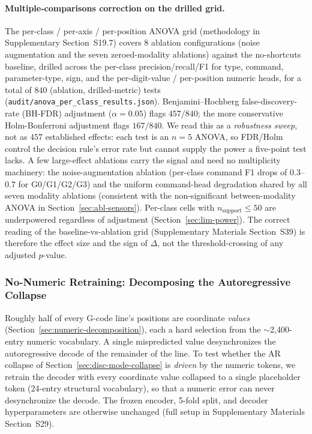\documentclass[sensors,article,submit,moreauthors,pdftex]{Definitions/mdpi}
\begin{document}
\paragraph{Multiple-comparisons correction on the drilled grid.} The per-class / per-axis / per-position ANOVA grid (methodology in Supplementary Section~S19.7) covers 8 ablation configurations (noise augmentation and the seven zeroed-modality ablations) against the no-shortcuts baseline, drilled across the per-class precision/recall/F1 for type, command, parameter-type, sign, and the per-digit-value / per-position numeric heads, for a total of $840$ (ablation, drilled-metric) tests (\texttt{audit/anova\_per\_class\_results.json}). Benjamini--Hochberg false-discovery-rate (BH-FDR) adjustment ($\alpha=0.05$) flags $457 / 840$; the more conservative Holm-Bonferroni adjustment flags $167 / 840$. We read this as a \emph{robustness sweep}, not as $457$ established effects: each test is an $n\!=\!5$ ANOVA, so FDR/Holm control the decision rule's error rate but cannot supply the power a five-point test lacks. A few large-effect ablations carry the signal and need no multiplicity machinery: the noise-augmentation ablation (per-class command F1 drops of $0.3$--$0.7$ for G0/G1/G2/G3) and the uniform command-head degradation shared by all seven modality ablations (consistent with the non-significant between-modality ANOVA in Section~\ref{sec:abl-sensors}). Per-class cells with $n_{\text{support}}\le 50$ are underpowered regardless of adjustment (Section~\ref{sec:lim-power}). The correct reading of the baseline-vs-ablation grid (Supplementary Materials Section~S39) is therefore the effect size and the sign of $\Delta$, not the threshold-crossing of any adjusted $p$-value.


\subsubsection{No-Numeric Retraining: Decomposing the Autoregressive Collapse}
\label{sec:abl-nonumeric}

Roughly half of every G-code line's positions are coordinate \emph{values} (Section~\ref{sec:numeric-decomposition}), each a hard selection from the $\sim$2{,}400-entry numeric vocabulary. A single mispredicted value desynchronizes the autoregressive decode of the remainder of the line. To test whether the AR collapse of Section~\ref{sec:disc-mode-collapse} is \emph{driven} by the numeric tokens, we retrain the decoder with every coordinate value collapsed to a single placeholder token (24-entry structural vocabulary), so that a numeric error can never desynchronize the decode. The frozen encoder, 5-fold split, and decoder hyperparameters are otherwise unchanged (full setup in Supplementary Materials Section~S29).
\end{document}
